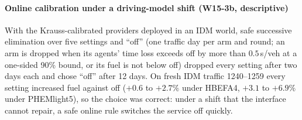 \paragraph{Online calibration under a driving-model shift (W15-3b, descriptive)} With the Krauss-calibrated providers deployed in an IDM
world, safe successive elimination over five settings and ``off'' (one traffic day per arm and round; an arm is dropped when its agents'
time loss exceeds off by more than $0.5$\,s/veh at a one-sided 90\% bound, or its fuel is not below off) dropped every setting after two days
each and chose ``off'' after 12 days. On fresh IDM traffic 1240--1259 every setting increased fuel against off ($+0.6$ to $+2.7\%$ under
HBEFA4, $+3.1$ to $+6.9\%$ under PHEMlight5), so the choice was correct: under a shift that the interface cannot repair, a safe online rule
switches the service off quickly.
